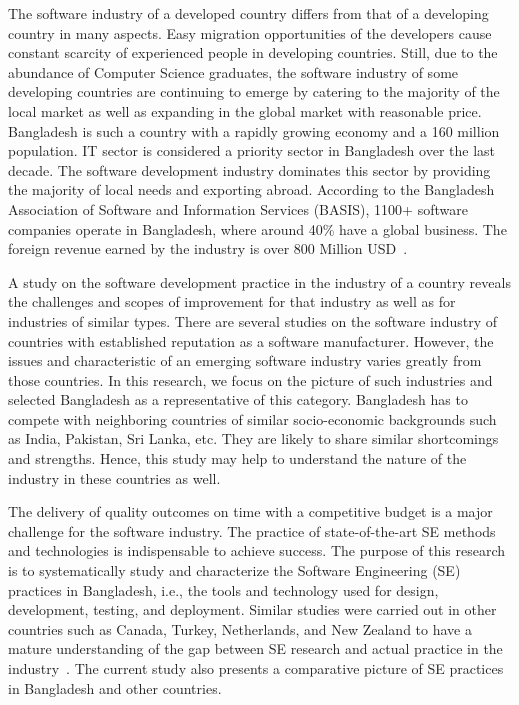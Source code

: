 The software industry of a developed country differs from that of a developing country in many aspects. Easy migration opportunities of the developers cause constant scarcity of experienced people in developing countries. Still, due to the abundance of Computer Science graduates, the software industry of some developing countries are continuing to emerge by catering to the majority of the local market as well as expanding in the global market with reasonable price. Bangladesh is such a country with a rapidly growing economy and a 160 million population. IT sector is considered a priority sector in Bangladesh over the last decade. The software development industry dominates this sector by providing the majority of local needs and exporting abroad. According to the Bangladesh Association of Software and Information Services (BASIS), 1100+ software companies operate in Bangladesh, where around 40\% have a global business. The foreign revenue earned by the industry is over 800 Million USD~\cite{BASIS2018}. 

A study on the software development practice in the industry of a country reveals the challenges and scopes of improvement for that industry as well as for industries of similar types. There are several studies on the software industry of countries with established reputation as a software manufacturer. However, the issues and characteristic of an emerging software industry varies greatly from those countries. In this research, we focus on the picture of such industries and selected Bangladesh as a representative of this category. Bangladesh has to compete with neighboring countries of similar socio-economic backgrounds such as India, Pakistan, Sri Lanka, etc. They are likely to share similar shortcomings and strengths. Hence, this study may help to understand the nature of the industry in these countries as well.


 The delivery of quality outcomes on time with a competitive budget is a major challenge for the software industry. The practice of state-of-the-art SE methods and technologies is indispensable to achieve success. The purpose of this research is to systematically study and characterize the Software Engineering (SE) practices in Bangladesh, i.e., the tools and technology used for design, development, testing, and deployment. Similar studies were carried out in other countries such as Canada, Turkey, Netherlands, and New Zealand to have a mature understanding of the gap between SE research and actual practice in the industry~\cite{Garousi2013, Garousi2015, Vonken2012, Wang2018}. The current study also presents a comparative picture of SE practices in Bangladesh and other countries. 

